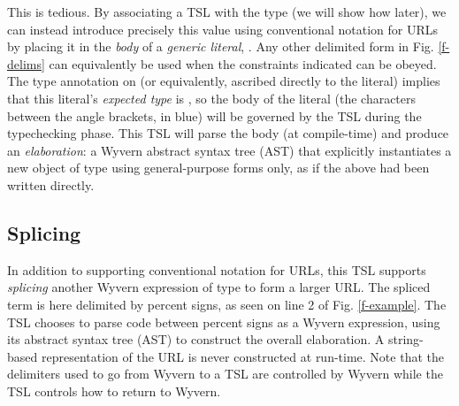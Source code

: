 This is tedious. By associating a TSL with the  type (we will show how later), we can instead introduce precisely this value using conventional notation for URLs by placing it in the \emph{body} of a \emph{generic literal}, . Any other delimited form in Fig. \ref{f-delims} can equivalently be used when the constraints indicated can be obeyed. The type annotation on  (or equivalently, ascribed directly to the literal) implies that this literal's \emph{expected type} is , so the {body} of the literal (the characters between the angle brackets, in blue) will be governed by the  TSL during the typechecking phase. This TSL will parse the body ({at compile-time}) and  produce an \emph{elaboration}: a Wyvern abstract syntax tree (AST) that explicitly instantiates a new object of type  using general-purpose forms only, as if the above had been written directly.

\subsection{Splicing}
In addition to supporting conventional notation for URLs, this TSL supports \emph{splicing}
another Wyvern expression of type  to form a larger URL. The spliced term is here delimited by percent signs,
as seen on line 2 of Fig. \ref{f-example}. The TSL chooses to parse code between percent signs  as a Wyvern expression, using its abstract syntax tree (AST) to construct the overall elaboration. A string-based representation of the URL is never constructed at run-time. Note that the delimiters used to go from Wyvern to a TSL are controlled by Wyvern while the TSL controls how to return to Wyvern. 
